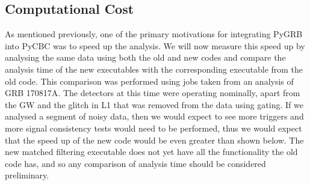 \documentclass[11pt]{cuthesis}
\begin{document}
%

\subsection{Computational Cost} \label{sec:speed gains}
As mentioned previously, one of the primary motivations for integrating PyGRB into PyCBC was to speed up the analysis. We will now measure this speed up by analysing the same data using both the old and new codes and compare the analysis time of the new executables with the corresponding executable from the old code. This comparison was performed using jobs taken from an analysis of GRB 170817A. The detectors at this time were operating nominally, apart from the GW and the glitch in L1 that was removed from the data using gating. If we analysed a segment of noisy data, then we would expect to see more triggers and more signal consistency tests would need to be performed, thus we would expect that the speed up of the new code would be even greater than shown below. The new matched filtering executable does not yet have all the functionality the old code has, and so any comparison of analysis time should be considered preliminary. 
\end{document}
